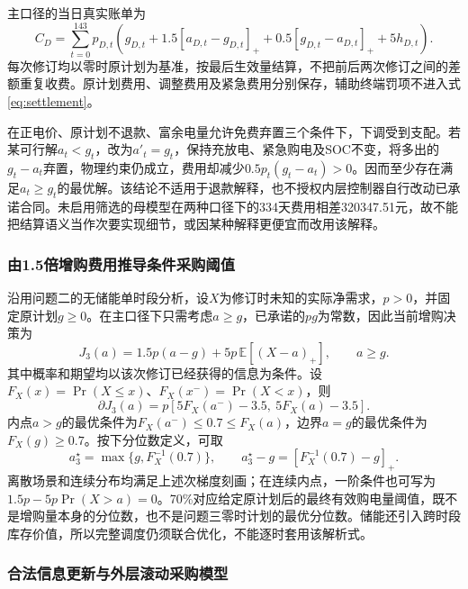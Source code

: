 主口径的当日真实账单为
\begin{equation}
 C_D=\sum_{t=0}^{143}p_{D,t}\left(g_{D,t}+1.5[a_{D,t}-g_{D,t}]_+
 +0.5[g_{D,t}-a_{D,t}]_++5h_{D,t}\right).
 \label{eq:settlement}
\end{equation}
每次修订均以零时原计划为基准，按最后生效量结算，不把前后两次修订之间的差额重复收费。原计划费用、调整费用及紧急费用分别保存，辅助终端罚项不进入式\eqref{eq:settlement}。

在正电价、原计划不退款、富余电量允许免费弃置三个条件下，下调受到支配。若某可行解$a_t<g_t$，改为$a'_t=g_t$，保持充放电、紧急购电及SOC不变，将多出的$g_t-a_t$弃置，物理约束仍成立，费用却减少$0.5p_t(g_t-a_t)>0$。因而至少存在满足$a_t\ge g_t$的最优解。该结论不适用于退款解释，也不授权内层控制器自行改动已承诺合同。未启用筛选的母模型在两种口径下的334天费用相差320347.51元，故不能把结算语义当作次要实现细节，或因某种解释更便宜而改用该解释。

\subsubsection{由1.5倍增购费用推导条件采购阈值}

沿用问题二的无储能单时段分析，设$X$为修订时未知的实际净需求，$p>0$，并固定原计划$g\ge0$。在主口径下只需考虑$a\ge g$，已承诺的$pg$为常数，因此当前增购决策为
\begin{equation}
 J_3(a)=1.5p(a-g)+5p\,\mathbb E[(X-a)_+],\qquad a\ge g.
 \label{eq:mech_q3_cost}
\end{equation}
其中概率和期望均以该次修订已经获得的信息为条件。设$F_X(x)=\Pr(X\le x)$、$F_X(x^-)=\Pr(X<x)$，则
\begin{equation}
 \partial J_3(a)=p[5F_X(a^-)-3.5,\ 5F_X(a)-3.5].
 \label{eq:q3_adjustment_subgradient}
\end{equation}
内点$a>g$的最优条件为$F_X(a^-)\le0.7\le F_X(a)$，边界$a=g$的最优条件为$F_X(g)\ge0.7$。按下分位数定义，可取
\begin{equation}
 a_3^\star=\max\{g,F_X^{-1}(0.7)\},\qquad
 a_3^\star-g=[F_X^{-1}(0.7)-g]_+.
 \label{eq:mech_q3_quantile}
\end{equation}
离散场景和连续分布均满足上述次梯度刻画；在连续内点，一阶条件也可写为$1.5p-5p\Pr(X>a)=0$。70\%对应给定原计划后的最终有效购电量阈值，既不是增购量本身的分位数，也不是问题三零时计划的最优分位数。储能还引入跨时段库存价值，所以完整调度仍须联合优化，不能逐时套用该解析式。

\subsubsection{合法信息更新与外层滚动采购模型}

